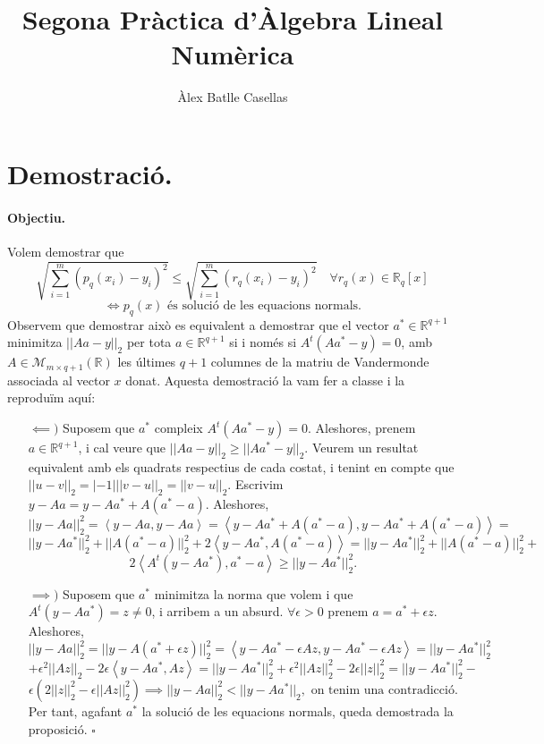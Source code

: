 \documentclass[11pt]{article}
\title{Segona Pràctica d'Àlgebra Lineal Numèrica}
\author{Àlex Batlle Casellas}
\newcommand{\scal}[2]{\left<#1,#2\right>}
\newcommand{\norm}[1]{||#1||_2}
\begin{document}
\maketitle
\section{Demostració.}
\paragraph{Objectiu.} Volem demostrar que
\[
\sqrt{\sum_{i=1}^m(p_q(x_i)-y_i)^2}\leq\sqrt{\sum_{i=1}^m(r_q(x_i)-y_i)^2}\quad\forall r_q(x)\in\mathbb{R}_q[x]
\]
\[\iff p_q(x)\text{ és solució de les equacions normals.}\]
Observem que demostrar això es equivalent a demostrar que el vector $a^*\in\mathbb{R}^{q+1}$ minimitza $||Aa-y||_2$ per tota $a\in\mathbb{R}^{q+1}$ si i només si $A^t(Aa^*-y)=0$, amb $A\in\mathcal{M}_{m\times q+1}(\mathbb{R})$ les últimes $q+1$ columnes de la matriu de Vandermonde associada al vector $x$ donat. Aquesta demostració la vam fer a classe i la reproduïm aquí:
\begin{itemize}
    \item[$\impliedby)$] Suposem que $a^*$ compleix $A^t(Aa^*-y)=0$. Aleshores, prenem $a\in\mathbb{R}^{q+1}$, i cal veure que $||Aa-y||_2\geq||Aa^*-y||_2$. Veurem un resultat equivalent amb els quadrats respectius de cada costat, i tenint en compte que $\norm{u-v}=|-1|\norm{v-u}=\norm{v-u}$. Escrivim $y-Aa=y-Aa^*+A(a^*-a)$. Aleshores,
    \[
    ||y-Aa||_2^2=\scal{y-Aa}{y-Aa}=\scal{y-Aa^*+A(a^*-a)}{y-Aa^*+A(a^*-a)}=\]
    \[\norm{y-Aa^*}^2+\norm{A(a^*-a)}^2+2\scal{y-Aa^*}{A(a^*-a)}=\norm{y-Aa^*}^2+\norm{A(a^*-a)}^2+\]
    \[2\scal{A^t(y-Aa^*)}{a^*-a}\geq\norm{y-Aa^*}^2.
    \]
    \item[$\implies)$] Suposem que $a^*$ minimitza la norma que volem i que $A^t(y-Aa^*)=z\neq0$, i arribem a un absurd. $\forall\epsilon>0$ prenem $a=a^*+\epsilon z$. Aleshores,
    \[
    \norm{y-Aa}^2=\norm{y-A(a^*+\epsilon z)}^2=\scal{y-Aa^*-\epsilon Az}{y-Aa^*-\epsilon Az}=\norm{y-Aa^*}^2
    \]
    \[
    +\epsilon^2\norm{Az}-2\epsilon\scal{y-Aa^*}{Az}=\norm{y-Aa^*}^2+\epsilon^2\norm{Az}^2-2\epsilon\norm{z}^2=\norm{y-Aa^*}^2-\]
    \[\epsilon(2\norm{z}^2-\epsilon\norm{Az}^2)\implies\norm{y-Aa}^2<\norm{y-Aa^*},\text{ on tenim una contradicció.}
    \]
    Per tant, agafant $a^*$ la solució de les equacions normals, queda demostrada la proposició. $\square$
\end{itemize}
\end{document}
